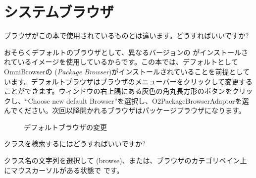 \documentclass[a4paper,10pt,twoside]{book}
\begin{document}
\section{システムブラウザ}


\begin{faq}
ブラウザがこの本で使用されているものとは違います。どうすればいいですか?
\end{faq}
\answer
おそらくデフォルトのブラウザとして、異なるバージョンの  がインストールされているイメージを使用しているからです。この本では、デフォルトとして OmniBrowserの (\emph{Package Browser})がインストールされていることを前提としています。デフォルトブラウザはブラウザのメニューバーをクリックして変更することができます。ウィンドウの右上隅にある灰色の角丸長方形のボタンをクリックし、“Choose new default Browser”を選択し、O2PackageBrowserAdaptorを選んでください。次回以降開かれるブラウザはパッケージブラウザになります。

\begin{figure}[tbh]
	\centering
	\hfill
	\hfill
	\caption{デフォルトブラウザの変更}
\end{figure}

\begin{faq}
クラスを検索するにはどうすればいいですか?
\end{faq}
\answer
クラス名の文字列を選択して  (browse)、または、ブラウザのカテゴリペイン上にマウスカーソルがある状態で  です。
\end{document}
